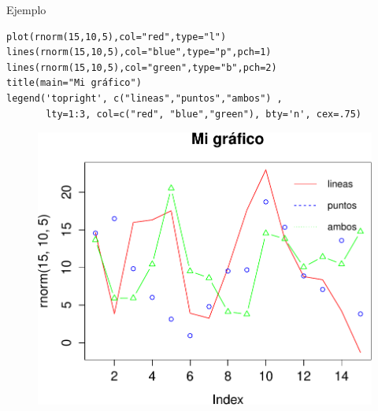 \documentclass[handout]{beamer}
\begin{document}
\begin{frame}[fragile]{Ejemplo}
\scriptsize{
  \begin{verbatim}
plot(rnorm(15,10,5),col="red",type="l")
lines(rnorm(15,10,5),col="blue",type="p",pch=1)
lines(rnorm(15,10,5),col="green",type="b",pch=2)
title(main="Mi gráfico")
legend('topright', c("lineas","puntos","ambos") , 
       lty=1:3, col=c("red", "blue","green"), bty='n', cex=.75)  
 \end{verbatim}
 
 
  \begin{figure}[h!]
	\centering
	\includegraphics[scale=0.38]{pics/rplot.pdf}
	
	
\end{figure} 



 
} 
\end{frame}
\end{document}

